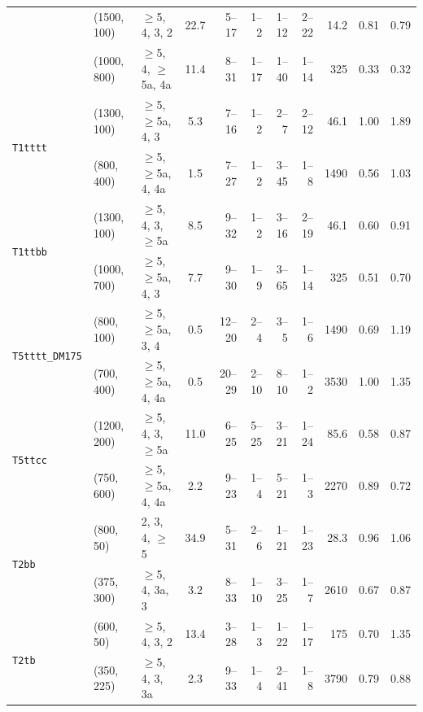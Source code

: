 \begin{table}[!t]
{\begin{tabular}{ lllcrrrrrcc }
 & (1500, 100) & $\geq$5, 4, 3, 2         & 22.7           & 5--17  & 1--2    & 1--12 & 2--22 & 14.2 & 0.81 & 0.79 \\
 & (1000, 800) & $\geq$5, 4, $\geq$5a, 4a & 11.4           & 8--31  & 1--17   & 1--40 & 1--14 & 325  & 0.33 & 0.32 \\ [0.5ex]
      \multirow{2}{*}{\texttt{T1tttt}}                    
 & (1300, 100) & $\geq$5, $\geq$5a, 4, 3  & \phantom{1}5.3 & 7--16  & 1--2    & 2--7  & 2--12 & 46.1 & 1.00 & 1.89 \\
 & (800, 400)  & $\geq$5, $\geq$5a, 4, 4a & \phantom{1}1.5 & 7--27  & 1--2    & 3--45 & 1--8  & 1490 & 0.56 & 1.03 \\ [0.5ex]
      \multirow{2}{*}{\texttt{T1ttbb}}                    
 & (1300, 100) & $\geq$5, 4, 3, $\geq$5a  & \phantom{1}8.5 & 9--32  & 1--2    & 3--16 & 2--19 & 46.1 & 0.60 & 0.91 \\
 & (1000, 700) & $\geq$5, $\geq$5a, 4, 3  & \phantom{1}7.7 & 9--30  & 1--9    & 3--65 & 1--14 & 325  & 0.51 & 0.70 \\ [0.5ex]
      \multirow{2}{*}{\texttt{T5tttt\_DM175}}             
 & (800, 100)  & $\geq$5, $\geq$5a, 3, 4  & \phantom{1}0.5 & 12--20 & 2--4    & 3--5  & 1--6  & 1490 & 0.69 & 1.19 \\
 & (700, 400)  & $\geq$5, $\geq$5a, 4, 4a & \phantom{1}0.5 & 20--29 & 2--10   & 8--10 & 1--2  & 3530 & 1.00 & 1.35 \\ [0.5ex]
      \multirow{2}{*}{\texttt{T5ttcc}}                    
 & (1200, 200) & $\geq$5, 4, 3, $\geq$5a  & 11.0           & 6--25  & 5--25   & 3--21 & 1--24 & 85.6 & 0.58 & 0.87 \\
 & (750, 600)  & $\geq$5, $\geq$5a, 4, 4a & \phantom{1}2.2 & 9--23  & 1--4    & 5--21 & 1--3  & 2270 & 0.89 & 0.72 \\ [0.5ex]
      \multirow{2}{*}{\texttt{T2bb}}                      
 & (800, 50)   & 2, 3, 4, $\geq$5         & 34.9           & 5--31  & 2--6    & 1--21 & 1--23 & 28.3 & 0.96 & 1.06 \\
 & (375, 300)  & $\geq$5, 4, 3a, 3        & \phantom{1}3.2 & 8--33  & 1--10   & 3--25 & 1--7  & 2610 & 0.67 & 0.87 \\ [0.5ex]
      \multirow{2}{*}{\texttt{T2tb}}                      
 & (600, 50)   & $\geq$5, 4, 3, 2         & 13.4           & 3--28  & 1--3    & 1--22 & 1--17 & 175  & 0.70 & 1.35 \\
 & (350, 225)  & $\geq$5, 4, 3, 3a        & \phantom{1}2.3 & 9--33  & 1--4    & 2--41 & 1--8  & 3790 & 0.79 & 0.88 \\ [0.5ex]

\end{tabular}}
\end{table}
